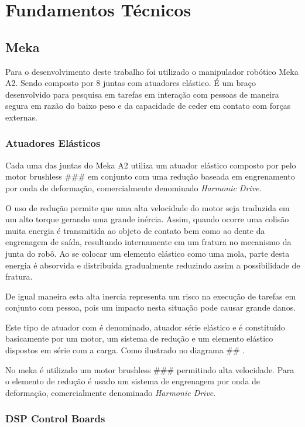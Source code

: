 \chapter{Fundamentos Técnicos}

\section{Meka}

Para o desenvolvimento deste trabalho foi utilizado o manipulador robótico Meka A2. Sendo composto por 8 juntas com atuadores elástico. É um braço desenvolvido para pesquisa em tarefas em interação com pessoas de maneira segura em razão do baixo peso e da capacidade de ceder em contato com forças externas. 

\subsection{Atuadores Elásticos}

Cada uma das juntas do Meka A2 utiliza um atuador elástico composto por pelo motor brushless ### em conjunto com uma redução baseada em engrenamento por onda de deformação, comercialmente denominado \textit{Harmonic Drive}.

O uso de redução permite que uma alta velocidade do motor seja traduzida em um alto torque gerando uma grande inércia. Assim, quando ocorre uma colisão muita energia é transmitida ao objeto de contato bem como ao dente da engrenagem de saída, resultando internamente em um fratura no mecanismo da junta do robô. Ao se colocar um elemento elástico como uma mola, parte desta energia é absorvida e distribuída gradualmente reduzindo assim a possibilidade de fratura. 

De igual maneira esta alta inercia representa um risco na execução de tarefas em conjunto com pessoa, pois um impacto nesta situação pode causar grande danos.

Este tipo de atuador com é denominado, atuador série elástico e é constituído basicamente por um motor, um sistema de redução e um elemento elástico dispostos em série com a carga. Como ilustrado no diagrama ## .


No meka é utilizado um motor brushless ### permitindo alta velocidade. Para o elemento de redução é usado um sistema de engrenagem por onda de deformação, comercialmente denominado \textit{Harmonic Drive}.

\subsection{DSP Control Boards}

